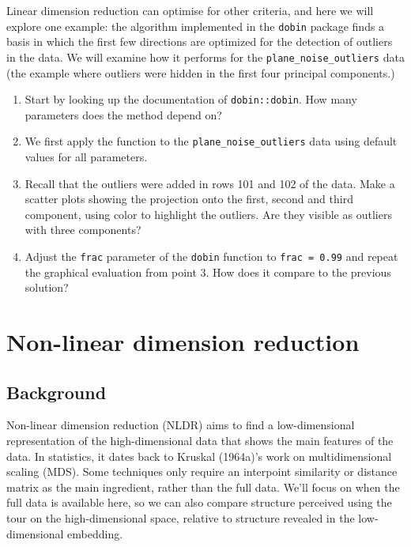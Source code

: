 \documentclass[
  letterpaper,
]{krantz}
\providecommand{\tightlist}{%
  \setlength{\itemsep}{0pt}\setlength{\parskip}{0pt}}\usepackage{longtable,booktabs,array}
\begin{document}

Linear dimension reduction can optimise for other criteria, and here we
will explore one example: the algorithm implemented in the
\texttt{dobin} package finds a basis in which the first few directions
are optimized for the detection of outliers in the data. We will examine
how it performs for the \texttt{plane\_noise\_outliers} data (the
example where outliers were hidden in the first four principal
components.)

\begin{enumerate}
\def\labelenumi{\arabic{enumi}.}
\tightlist
\item
  Start by looking up the documentation of \texttt{dobin::dobin}. How
  many parameters does the method depend on?
\item
  We first apply the function to the \texttt{plane\_noise\_outliers}
  data using default values for all parameters.
\item
  Recall that the outliers were added in rows 101 and 102 of the data.
  Make a scatter plots showing the projection onto the first, second and
  third component, using color to highlight the outliers. Are they
  visible as outliers with three components?
\item
  Adjust the \texttt{frac} parameter of the \texttt{dobin} function to
  \texttt{frac\ =\ 0.99} and repeat the graphical evaluation from point
  3. How does it compare to the previous solution?
\end{enumerate}

\hypertarget{non-linear-dimension-reduction}{%
\chapter{Non-linear dimension
reduction}\label{non-linear-dimension-reduction}}

\hypertarget{background}{%
\section{Background}\label{background}}

Non-linear dimension reduction (NLDR) aims to find a low-dimensional
representation of the high-dimensional data that shows the main features
of the data. In statistics, it dates back to Kruskal (1964a)'s work on
multidimensional scaling (MDS). Some techniques only require an
interpoint similarity or distance matrix as the main ingredient, rather
than the full data. We'll focus on when the full data is available here,
so we can also compare structure perceived using the tour on the
high-dimensional space, relative to structure revealed in the
low-dimensional embedding.
\end{document}
